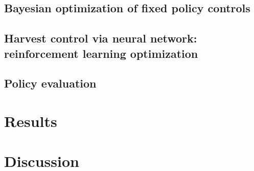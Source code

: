 \documentclass[floatfix,nofootinbib,longbibliography,notitlepage]{revtex4-1}
\begin{document}
\subsection{Bayesian optimization of fixed policy controls}

\subsection{Harvest control via neural network: reinforcement learning optimization}

\subsection{Policy evaluation}


%
%
%
\section{Results}


%
%
%
\section{Discussion}




 

\end{document}
